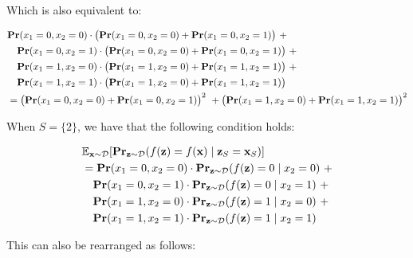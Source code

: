 \documentclass{article}
\newcommand{\z}{\textbf{z}}
\newcommand{\x}{\textbf{x}}
\newcommand{\mbf}[1]{\ensuremath\mathbf{#1}}
\newcommand{\mbb}[1]{\ensuremath\mathbb{#1}}
\begin{document}
Which is also equivalent to:

\begin{equation*}
\begin{aligned}
& \mbf{Pr}(x_1 = 0, x_2 = 0) \cdot \bigl(\mbf{Pr}(x_1 = 0, x_2 = 0) + \mbf{Pr}(x_1 = 0, x_2 = 1)\bigr) \ + \\
&\hspace{1em} \mbf{Pr}(x_1 = 0, x_2 = 1) \cdot \bigl(\mbf{Pr}(x_1 = 0, x_2 = 0) + \mbf{Pr}(x_1 = 0, x_2 = 1)\bigr) \ + \\
&\hspace{1em} \mbf{Pr}(x_1 = 1, x_2 = 0) \cdot \bigl(\mbf{Pr}(x_1 = 1, x_2 = 0) + \mbf{Pr}(x_1 = 1, x_2 = 1)\bigr) \ + \\
&\hspace{1em} \mbf{Pr}(x_1 = 1, x_2 = 1) \cdot \bigl(\mbf{Pr}(x_1 = 1, x_2 = 0) + \mbf{Pr}(x_1 = 1, x_2 = 1)\bigr) \\
%
&= \bigl(\mbf{Pr}(x_1 = 0, x_2 = 0) + \mbf{Pr}(x_1 = 0, x_2 = 1)\bigr)^2 \ + \bigl(\mbf{Pr}(x_1 = 1, x_2 = 0) + \mbf{Pr}(x_1 = 1, x_2 = 1)\bigr)^2
\end{aligned}
\end{equation*}


When $S = \{2\}$, we have that the following condition holds:

\begin{equation*}
\begin{aligned}
&\mbb{E}_{\x\sim \mathcal{D}}[\mbf{Pr}_{\z\sim \mathcal{D}}(f(\z) = f(\x) \mid \z_{S} = \x_{S})] \\
&= \mbf{Pr}(x_1 = 0, x_2 = 0) \cdot \mbf{Pr}_{\z\sim \mathcal{D}}(f(\z) = 0 \mid x_2 = 0) \ + \\
&\hspace{1em} \mbf{Pr}(x_1 = 0, x_2 = 1) \cdot \mbf{Pr}_{\z\sim \mathcal{D}}(f(\z) = 0 \mid x_2 = 1) \ + \\
&\hspace{1em} \mbf{Pr}(x_1 = 1, x_2 = 0) \cdot \mbf{Pr}_{\z\sim \mathcal{D}}(f(\z) = 1 \mid x_2 = 0) \ + \\
&\hspace{1em} \mbf{Pr}(x_1 = 1, x_2 = 1) \cdot \mbf{Pr}_{\z\sim \mathcal{D}}(f(\z) = 1 \mid x_2 = 1) \\
\end{aligned}
\end{equation*}

This can also be rearranged as follows:
\end{document}
